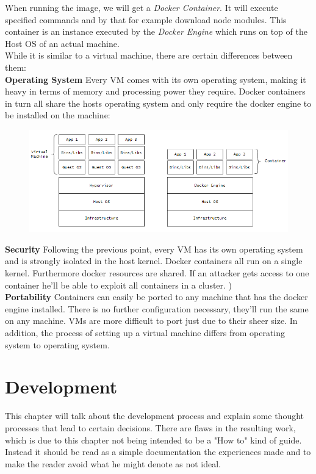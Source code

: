 When running the image, we will get a \emph{Docker Container}. It will execute specified commands and by that for example download node modules. This container is an instance executed by the \emph{Docker Engine} which runs on top of the Host OS of an actual machine.
\\

While it is similar to a virtual machine, there are certain differences between them: \\
\textbf{Operating System} Every VM comes with its own operating system, making it heavy in terms of memory and processing power they require. Docker containers in turn all share the hosts operating system and only require the docker engine to be installed on the machine: \cite{GeekDocker}
\begin{figure}[H]
\centering
\includegraphics[scale=.8]{Bilder/DockerVsVM.png}
\label{ex312}
\end{figure}
\noindent
\textbf{Security} Following the previous point, every VM has its own operating system and is strongly isolated in the host kernel. Docker containers all run on a single kernel. Furthermore docker resources are shared. If an attacker gets access to one container he'll be able to exploit  all containers in a cluster. \cite{GeekDocker}) \\
\textbf{Portability} Containers can easily be ported to any machine that has the docker engine installed. There is no further configuration necessary, they'll run the same on any machine. VMs are more difficult to port just due to their sheer size. In addition, the process of setting up a virtual machine differs from operating system to operating system. 

\chapter{Development}
This chapter will talk about the development process and explain some thought processes that lead to certain decisions. There are flaws in the resulting work, which is due to this chapter not being intended to be a "How to" kind of guide. Instead it should be read as a simple documentation the experiences made and to make the reader avoid what he might denote as not ideal.

